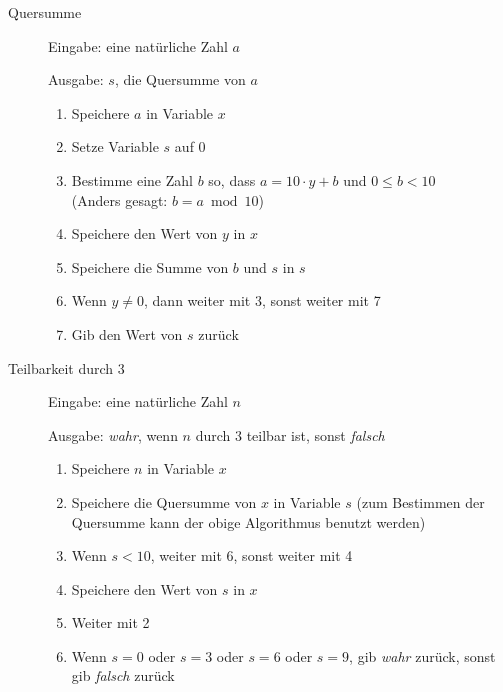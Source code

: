 \documentclass[]{article}
\begin{document}
	\begin{description}
		\item[Quersumme]
		
		Eingabe: eine natürliche Zahl $a$
		
		Ausgabe: $s$, die Quersumme von $a$
		
		\begin{enumerate}
			\item Speichere $a$ in Variable $x$
			\item Setze Variable $s$ auf 0
			\item Bestimme eine Zahl $b$ so, dass $a = 10 \cdot y + b$ und $0 \leq b < 10$ \\(Anders gesagt: $b = a \bmod 10$)
			\item Speichere den Wert von $y$ in $x$
			\item Speichere die Summe von $b$ und $s$ in $s$
			\item Wenn $y \neq 0$, dann weiter mit 3, sonst weiter mit 7
			\item Gib den Wert von $s$ zurück
		\end{enumerate}
		
		\item[Teilbarkeit durch 3]
		
		Eingabe: eine natürliche Zahl $n$
		
		Ausgabe: \emph{wahr}, wenn $n$ durch $3$ teilbar ist, sonst \emph{falsch}
		
		\begin{enumerate}
			\item Speichere $n$ in Variable $x$
			\item Speichere die Quersumme von $x$ in Variable $s$ (zum Bestimmen der Quersumme kann der obige Algorithmus benutzt werden)
			\item Wenn $s < 10$, weiter mit 6, sonst weiter mit 4
			\item Speichere den Wert von $s$ in $x$
			\item Weiter mit 2
			\item Wenn $s = 0$ oder $s = 3$ oder $s = 6$ oder $s = 9$, gib \emph{wahr} zurück, sonst gib \emph{falsch} zurück
		\end{enumerate}
		
	\end{description}

	
\end{document}
